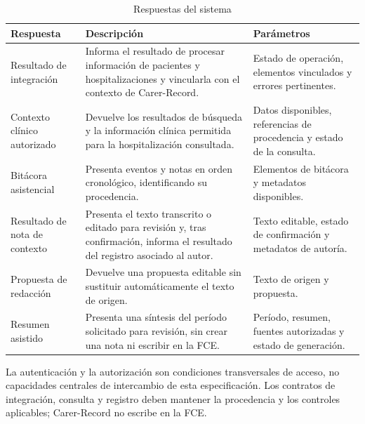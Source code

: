 \begin{table}[H]
    \caption{Respuestas del sistema}
    \label{tab:respuestas_sistema}
    \begin{tabularx}{\textwidth}{|l|X|X|}
        \hline
        \textbf{Respuesta} & \textbf{Descripción} & \textbf{Parámetros} \\
        \hline
        Resultado de integración & Informa el resultado de procesar información de pacientes y hospitalizaciones y vincularla con el contexto de Carer-Record. & Estado de operación, elementos vinculados y errores pertinentes. \\
        \hline
        Contexto clínico autorizado & Devuelve los resultados de búsqueda y la información clínica permitida para la hospitalización consultada. & Datos disponibles, referencias de procedencia y estado de la consulta. \\
        \hline
        Bitácora asistencial & Presenta eventos y notas en orden cronológico, identificando su procedencia. & Elementos de bitácora y metadatos disponibles. \\
        \hline
        Resultado de nota de contexto & Presenta el texto transcrito o editado para revisión y, tras confirmación, informa el resultado del registro asociado al autor. & Texto editable, estado de confirmación y metadatos de autoría. \\
        \hline
        Propuesta de redacción & Devuelve una propuesta editable sin sustituir automáticamente el texto de origen. & Texto de origen y propuesta. \\
        \hline
        Resumen asistido & Presenta una síntesis del período solicitado para revisión, sin crear una nota ni escribir en la FCE. & Período, resumen, fuentes autorizadas y estado de generación. \\
        \hline
    \end{tabularx}
\end{table}

La autenticación y la autorización son condiciones transversales de acceso, no capacidades centrales de intercambio de esta especificación. Los contratos de integración, consulta y registro deben mantener la procedencia y los controles aplicables; Carer-Record no escribe en la FCE.

